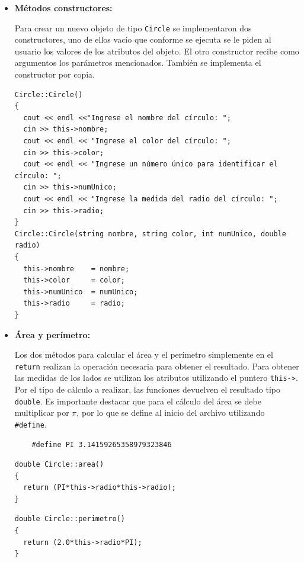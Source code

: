 \begin{itemize}
\item \textbf{Métodos constructores:}

	Para crear un nuevo objeto de tipo \texttt{Circle} se implementaron dos constructores, uno de ellos vacío que conforme se ejecuta se le piden al usuario los valores de los atributos del objeto. El otro constructor recibe como argumentos los parámetros mencionados. También se implementa el constructor por copia.
    
\begin{verbatim}
Circle::Circle()
{
  cout << endl <<"Ingrese el nombre del círculo: ";
  cin >> this->nombre;
  cout << endl << "Ingrese el color del círculo: ";
  cin >> this->color;
  cout << endl << "Ingrese un número único para identificar el círculo: ";
  cin >> this->numUnico;
  cout << endl << "Ingrese la medida del radio del círculo: ";
  cin >> this->radio;
}
Circle::Circle(string nombre, string color, int numUnico, double radio)
{
  this->nombre    = nombre;
  this->color     = color;
  this->numUnico  = numUnico;
  this->radio     = radio;
}
\end{verbatim}

\item \textbf{Área y perímetro:}

	Los dos métodos para calcular el área y el perímetro simplemente en el \texttt{return} realizan la operación necesaria para obtener el resultado. Para obtener las medidas de los lados se utilizan los atributos utilizando el puntero \texttt{this->}. Por el tipo de cálculo a realizar, las funciones devuelven el resultado tipo \texttt{double}. Es importante destacar que para el cálculo del área se debe multiplicar por $\pi$, por lo que se define al inicio del archivo utilizando \texttt{\#define}.
    
	\begin{verbatim}
    #define PI 3.14159265358979323846
\end{verbatim}
    
	\begin{verbatim}
double Circle::area()
{
  return (PI*this->radio*this->radio);
}
\end{verbatim}

	\begin{verbatim}
double Circle::perimetro()
{
  return (2.0*this->radio*PI);
}
\end{verbatim}


\end{itemize}

